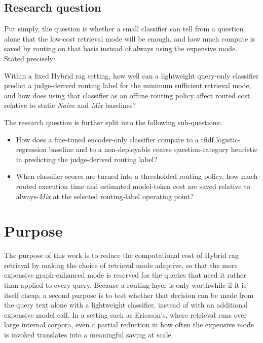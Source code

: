 \documentclass[english, bibtex]{kththesis}               %
\numberwithin{listing}{chapter}
\begin{document}
\subsection{Research question}
\label{sec:researchQuestion}

Put simply, the question is whether a small classifier can tell from a question alone that the low-cost retrieval mode will be enough, and how much compute is saved by routing on that basis instead of always using the expensive mode. Stated precisely:

Within a fixed Hybrid \gls{rag} setting, how well can a lightweight query-only classifier predict a judge-derived routing label for the minimum sufficient retrieval mode, and how does using that classifier as an offline routing policy affect routed cost relative to static \emph{Naive} and \emph{Mix} baselines?

The research question is further split into the following sub-questions:

\begin{itemize}
    \item How does a fine-tuned encoder-only classifier compare to a \gls{tfidf} logistic-regression baseline and to a non-deployable coarse question-category heuristic in predicting the judge-derived routing label?
    \item When classifier scores are turned into a thresholded routing policy, how much routed execution time and estimated model-token cost are saved relative to always-\emph{Mix} at the selected routing-label operating point?
\end{itemize}

\section{Purpose}
\label{sec:purpose}
The purpose of this work is to reduce the computational cost of Hybrid \gls{rag} retrieval by making the choice of retrieval mode adaptive, so that the more expensive graph-enhanced mode is reserved for the queries that need it rather than applied to every query. Because a routing layer is only worthwhile if it is itself cheap, a second purpose is to test whether that decision can be made from the query text alone with a lightweight classifier, instead of with an additional expensive model call. In a setting such as Ericsson's, where retrieval runs over large internal corpora, even a partial reduction in how often the expensive mode is invoked translates into a meaningful saving at scale.
\end{document}
